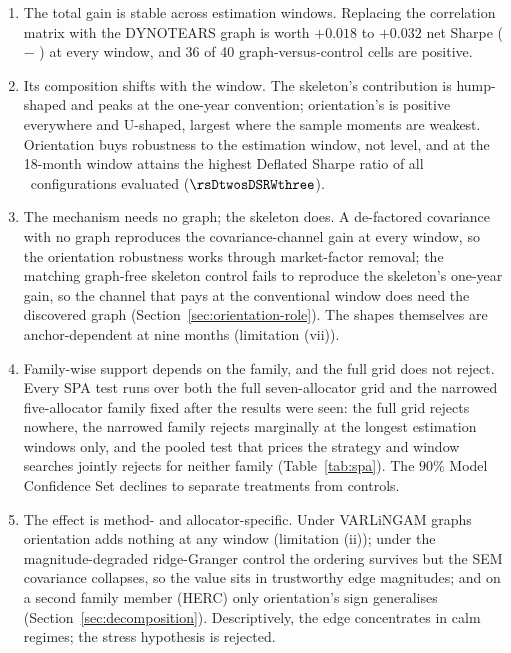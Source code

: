 \begin{enumerate}[itemsep=2pt]
  \item The total gain is stable across estimation windows.
        Replacing the correlation matrix with the DYNOTEARS graph is
        worth $+0.018$ to $+0.032$ net Sharpe (\skelsem{} $-$ \HRP{})
        at every window, and 36 of 40 graph-versus-control cells are
        positive.
  \item Its composition shifts with the window. The skeleton's
        contribution is hump-shaped and peaks at the one-year
        convention; orientation's is positive everywhere and U-shaped,
        largest where the sample moments are weakest. Orientation buys
        robustness to the estimation window, not level, and at the
        18-month window \orientsem{} attains the highest Deflated
        Sharpe ratio of all \rsNtrials\ configurations evaluated
        ($\rsDtwosDSRWthree$).
  \item The mechanism needs no graph; the skeleton does. A
        de-factored covariance with no graph reproduces the
        covariance-channel gain at every window, so the orientation
        robustness works through market-factor removal; the matching
        graph-free skeleton control fails to reproduce the skeleton's
        one-year gain, so the channel that pays at the conventional
        window does need the discovered graph
        (Section~\ref{sec:orientation-role}). The shapes themselves
        are anchor-dependent at nine months (limitation (vii)).
  \item Family-wise support depends on the family, and the
        full grid does not reject. Every SPA test runs over both the
        full seven-allocator grid and the narrowed five-allocator
        family fixed after the results were seen: the full grid rejects
        nowhere, the narrowed family rejects marginally at the longest
        estimation windows only, and the pooled test that prices the
        strategy and window searches jointly rejects for neither family
        (Table~\ref{tab:spa}). The $90\%$ Model Confidence Set declines
        to separate treatments from controls.
  \item The effect is method- and allocator-specific. Under
        VARLiNGAM graphs orientation adds nothing at any window
        (limitation (ii)); under the magnitude-degraded ridge-Granger
        control the ordering survives but the SEM covariance collapses,
        so the value sits in trustworthy edge magnitudes; and on a
        second family member (HERC) only orientation's sign generalises
        (Section~\ref{sec:decomposition}). Descriptively, the edge
        concentrates in calm regimes; the stress hypothesis is
        rejected.
\end{enumerate}

